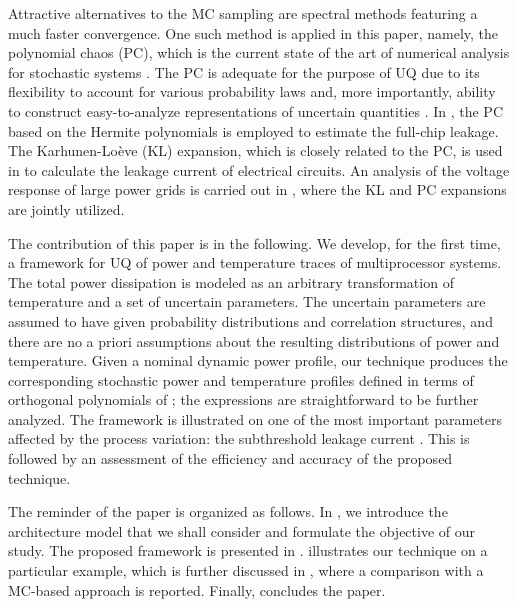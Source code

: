 Attractive alternatives to the MC sampling are spectral methods \cite{xiu2010, maitre2010, ghanem1991} featuring a much faster convergence. One such method is applied in this paper, namely, the polynomial chaos (PC), which is the current state of the art of numerical analysis for stochastic systems \cite{xiu2010}. The PC is adequate for the purpose of UQ due to its flexibility to account for various probability laws and, more importantly, ability to construct easy-to-analyze representations of uncertain quantities \cite{eldred2009}. In \cite{shen2009}, the PC based on the Hermite polynomials is employed to estimate the full-chip leakage. The Karhunen-Lo\`{e}ve (KL) expansion, which is closely related to the PC, is used in \cite{bhardwaj2006} to calculate the leakage current of electrical circuits. An analysis of the voltage response of large power grids is carried out in \cite{ghanta2006}, where the KL and PC expansions are jointly utilized.

The contribution of this paper is in the following. We develop, for the first time, a framework for UQ of power and temperature traces of multiprocessor systems. The total power dissipation is modeled as an arbitrary transformation of temperature and a set of uncertain parameters. The uncertain parameters are assumed to have given probability distributions and correlation structures, and there are no a priori assumptions about the resulting distributions of power and temperature. Given a nominal dynamic power profile, our technique produces the corresponding stochastic power and temperature profiles defined in terms of orthogonal polynomials of \rvs; the expressions are straightforward to be further analyzed. The framework is illustrated on one of the most important parameters affected by the process variation: the subthreshold leakage current \cite{srivastava2010}. This is followed by an assessment of the efficiency and accuracy of the proposed technique.

The reminder of the paper is organized as follows. In , we introduce the architecture model that we shall consider and formulate the objective of our study. The proposed framework is presented in .  illustrates our technique on a particular example, which is further discussed in , where a comparison with a MC-based approach is reported. Finally,  concludes the paper.
